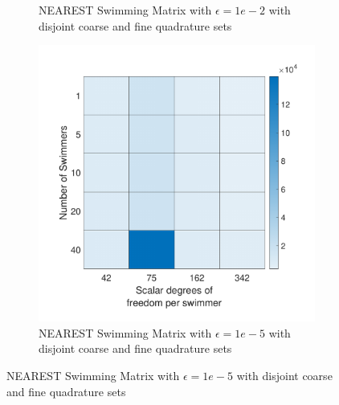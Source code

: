 \begin{figure}
\begin{subfigure}{0.3\textwidth}
        \caption{NEAREST Swimming Matrix with $\epsilon=1e-2$ with disjoint coarse and fine quadrature sets}    
    \end{subfigure}
    \begin{subfigure}{0.3\textwidth}
        \includegraphics[width=\linewidth]{Images/Condition/Mobility Matrix using Disjoint NEAREST-5.pdf}
        \caption{NEAREST Swimming Matrix with $\epsilon=1e-5$ with disjoint coarse and fine quadrature sets}    
    \end{subfigure}
\end{figure}

